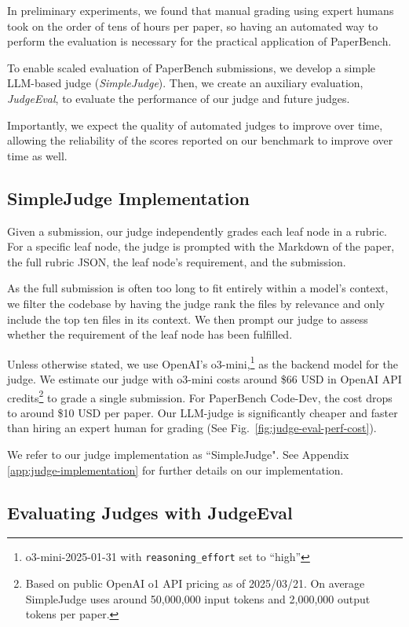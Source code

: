 \documentclass{article}
\theoremstyle{plain}
\theoremstyle{definition}
\theoremstyle{remark}
\begin{document}
In preliminary experiments, we found that manual grading using expert humans took on the order of tens of hours per paper, so having an automated way to perform the evaluation is necessary for the practical application of PaperBench.

To enable scaled evaluation of PaperBench submissions, we develop a simple LLM-based judge (\textit{SimpleJudge}). Then, we create an auxiliary evaluation, \textit{JudgeEval}, to evaluate the performance of our judge and future judges.

Importantly, we expect the quality of automated judges to improve over time, allowing the reliability of the scores reported on our benchmark to improve over time as well.

\subsection{SimpleJudge Implementation}

Given a submission, our judge independently grades each leaf node in a rubric. For a specific leaf node, the judge is prompted with the Markdown of the paper, the full rubric JSON, the leaf node's requirement, and the submission.

As the full submission is often too long to fit entirely within a model's context, we filter the codebase by having the judge rank the files by relevance and only include the top ten files in its context. We then prompt our judge to assess whether the requirement of the leaf node has been fulfilled.

Unless otherwise stated, we use OpenAI's o3-mini,\footnote{o3-mini-2025-01-31 with \texttt{reasoning\_effort} set to ``high''} as the backend model for the judge. We estimate our judge with o3-mini costs around \$66 USD in OpenAI API credits\footnote{Based on public OpenAI o1 API pricing as of 2025/03/21. On average SimpleJudge uses around 50,000,000 input tokens and 2,000,000 output tokens per paper.} to grade a single submission. For PaperBench Code-Dev, the cost drops to around \$10 USD per paper.  Our LLM-judge is significantly cheaper and faster than hiring an expert human for grading (See Fig.~\ref{fig:judge-eval-perf-cost}).

We refer to our judge implementation as ``SimpleJudge". See Appendix \ref{app:judge-implementation} for further details on our implementation.

\subsection{Evaluating Judges with JudgeEval}
\label{sec:validating-the-llm-judge}
\end{document}
